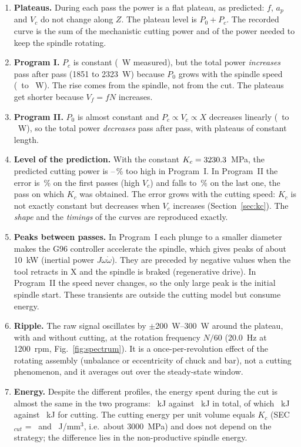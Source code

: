 \documentclass[11pt,a4paper]{article}
\begin{document}
\begin{enumerate}
  \item \textbf{Plateaus.} During each pass the power is a flat plateau, as predicted:
        $f$, $a_p$ and $V_c$ do not change along $Z$. The plateau level is $P_0+P_c$.
        The recorded curve is the sum of the mechanistic cutting power and of the power
        needed to keep the spindle rotating.
  \item \textbf{Program I.} $P_c$ is constant (\PcOneMean~W measured), but the total
        power \emph{increases} pass after pass (1851 to 2323~W) because $P_0$ grows with
        the spindle speed (\PzeroOneFirst\ to \PzeroOneLast~W). The rise comes from the
        spindle, not from the cut. The plateaus get shorter because $V_f=fN$ increases.
  \item \textbf{Program II.} $P_0$ is almost constant and $P_c\propto V_c\propto X$
        decreases linearly (\PcTwoFirst\ to \PcTwoLast~W), so the total power
        \emph{decreases} pass after pass, with plateaus of constant length.
  \item \textbf{Level of the prediction.} With the constant $K_c=3230.3$~MPa, the
        predicted cutting power is \PcErrOneMin--\PcErrOneMax\,\% too high in
        Program~I. In Program~II the error is \PcErrTwoMax\,\% on the first passes (high
        $V_c$) and falls to \PcErrTwoMin\,\% on the last one, the pass on which $K_c$ was
        obtained. The
        error grows with the cutting speed: $K_c$ is not exactly constant but decreases
        when $V_c$ increases (Section~\ref{sec:kc}). The \emph{shape} and the
        \emph{timings} of the curves are reproduced exactly.
  \item \textbf{Peaks between passes.} In Program~I each plunge to a smaller diameter
        makes the G96 controller accelerate the spindle, which gives peaks of about
        \SI{10}{kW} (inertial power $J\omega\dot\omega$). They are preceded by negative
        values when the tool retracts in X and the spindle is braked (regenerative
        drive). In Program~II the speed never changes, so the only large peak is the
        initial spindle start. These transients are outside the cutting model but
        consume energy.
  \item \textbf{Ripple.} The raw signal oscillates by $\pm$\SIrange{200}{300}{W} around
        the plateau, with and without cutting, at the rotation frequency $N/60$
        (20.0~Hz at 1200~rpm, Fig.~\ref{fig:spectrum}). It is a once-per-revolution
        effect of the rotating assembly (unbalance or eccentricity of chuck and bar), not
        a cutting phenomenon, and it averages out over the steady-state window.
  \item \textbf{Energy.} Despite the different profiles, the energy spent during the
        cut is almost the same in the two programs: \EOne~kJ against \ETwo~kJ in
        total, of which \ECutOne~kJ against \ECutTwo~kJ for cutting. The cutting energy
        per unit volume equals $K_c$ (SEC$_{cut}$ = \SECcutOne\ and \SECcutTwo~J/mm$^3$,
        i.e.\ about \SI{3000}{MPa}) and does not depend on the strategy; the difference
        lies in the non-productive spindle energy.
\end{enumerate}
\end{document}
